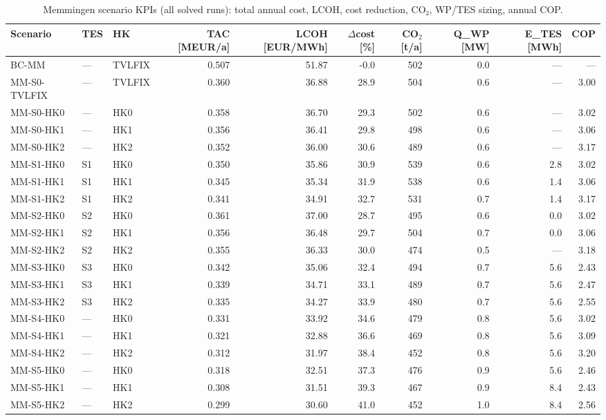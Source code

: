 \begin{table}[htbp]
  \centering
  \caption{Memmingen scenario KPIs (all solved runs): total annual cost, LCOH, cost reduction, CO₂, WP/TES sizing, annual COP.}
  \label{tab:tab_T4_memmingen_kpis}
  \begin{tabular}{ll lrrrrrrr}
  \toprule
  Scenario & TES & HK & TAC [MEUR/a] & LCOH [EUR/MWh] & $\Delta$cost [\%] & CO$_2$ [t/a] & Q\_WP [MW] & E\_TES [MWh] & COP \\
  \midrule
  BC-MM & — & TVLFIX & 0.507 & 51.87 & -0.0 & 502 & 0.0 & — & — \\
  MM-S0-TVLFIX & — & TVLFIX & 0.360 & 36.88 & 28.9 & 504 & 0.6 & — & 3.00 \\
  MM-S0-HK0 & — & HK0 & 0.358 & 36.70 & 29.3 & 502 & 0.6 & — & 3.02 \\
  MM-S0-HK1 & — & HK1 & 0.356 & 36.41 & 29.8 & 498 & 0.6 & — & 3.06 \\
  MM-S0-HK2 & — & HK2 & 0.352 & 36.00 & 30.6 & 489 & 0.6 & — & 3.17 \\
  MM-S1-HK0 & S1 & HK0 & 0.350 & 35.86 & 30.9 & 539 & 0.6 & 2.8 & 3.02 \\
  MM-S1-HK1 & S1 & HK1 & 0.345 & 35.34 & 31.9 & 538 & 0.6 & 1.4 & 3.06 \\
  MM-S1-HK2 & S1 & HK2 & 0.341 & 34.91 & 32.7 & 531 & 0.7 & 1.4 & 3.17 \\
  MM-S2-HK0 & S2 & HK0 & 0.361 & 37.00 & 28.7 & 495 & 0.6 & 0.0 & 3.02 \\
  MM-S2-HK1 & S2 & HK1 & 0.356 & 36.48 & 29.7 & 504 & 0.7 & 0.0 & 3.06 \\
  MM-S2-HK2 & S2 & HK2 & 0.355 & 36.33 & 30.0 & 474 & 0.5 & — & 3.18 \\
  MM-S3-HK0 & S3 & HK0 & 0.342 & 35.06 & 32.4 & 494 & 0.7 & 5.6 & 2.43 \\
  MM-S3-HK1 & S3 & HK1 & 0.339 & 34.71 & 33.1 & 489 & 0.7 & 5.6 & 2.47 \\
  MM-S3-HK2 & S3 & HK2 & 0.335 & 34.27 & 33.9 & 480 & 0.7 & 5.6 & 2.55 \\
  MM-S4-HK0 & — & HK0 & 0.331 & 33.92 & 34.6 & 479 & 0.8 & 5.6 & 3.02 \\
  MM-S4-HK1 & — & HK1 & 0.321 & 32.88 & 36.6 & 469 & 0.8 & 5.6 & 3.09 \\
  MM-S4-HK2 & — & HK2 & 0.312 & 31.97 & 38.4 & 452 & 0.8 & 5.6 & 3.20 \\
  MM-S5-HK0 & — & HK0 & 0.318 & 32.51 & 37.3 & 476 & 0.9 & 5.6 & 2.46 \\
  MM-S5-HK1 & — & HK1 & 0.308 & 31.51 & 39.3 & 467 & 0.9 & 8.4 & 2.43 \\
  MM-S5-HK2 & — & HK2 & 0.299 & 30.60 & 41.0 & 452 & 1.0 & 8.4 & 2.56 \\
  \bottomrule
  \end{tabular}
\end{table}
